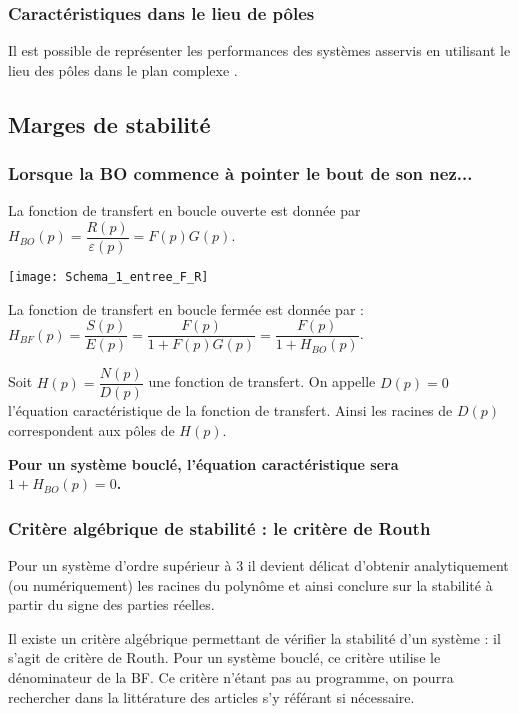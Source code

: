 \subsubsection{Caractéristiques dans le lieu de pôles}
Il est possible de représenter les performances des systèmes asservis en utilisant le lieu des pôles dans le plan complexe \cite{1}. 

\subsection{Marges de stabilité}
\subsubsection{Lorsque la BO commence à pointer le bout de son nez...}



La fonction de transfert en boucle ouverte est donnée par $H_{BO}(p)=\dfrac{R(p)}{\varepsilon(p)}=F(p)G(p)$. 

\begin{marginfigure}
\texttt{[image: Schema\_1\_entree\_F\_R]}
\end{marginfigure}

La fonction de transfert en boucle fermée est donnée par : $H_{BF}(p)=\dfrac{S(p)}{E(p)}=\dfrac{F(p)}{1+F(p)G(p)}=\dfrac{F(p)}{1+H_{BO}(p)}$. 

\begin{defi}
Soit $H(p)=\dfrac{N(p)}{D(p)}$ une fonction de transfert. On appelle $D(p)=0$ l'équation caractéristique de la fonction de transfert. Ainsi les racines de $D(p)$ correspondent aux pôles de $H(p)$.
\end{defi}

\textbf{Pour un système bouclé, l'équation caractéristique sera $1+H_{BO}(p)=0$.}

\subsubsection{Critère algébrique de stabilité : le critère de Routh}
Pour un système d'ordre supérieur à 3 il devient délicat d'obtenir analytiquement (ou numériquement) les racines du polynôme et ainsi conclure sur la stabilité à partir du signe des parties réelles. 

Il existe un critère algébrique permettant de vérifier la stabilité d'un système : il s'agit de critère de Routh. Pour un système bouclé, ce critère utilise le dénominateur de la BF. Ce critère n'étant pas au programme, on pourra rechercher dans la littérature des articles s'y référant si nécessaire. 

